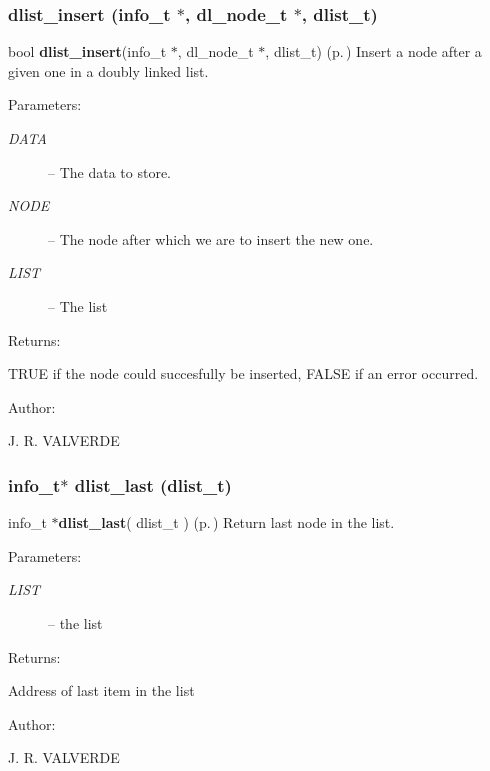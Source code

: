 \subsubsection{ dlist\_\-insert (info\_\-t $\ast$, {\bf dl\_\-node\_\-t} $\ast$, {\bf dlist\_\-t})}\label{P__dlist_8h_a5}


bool {\bf dlist\_\-insert}(info\_\-t $\ast$, dl\_\-node\_\-t $\ast$, dlist\_\-t) {\rm (p.\,\pageref{P__dlist_8h_a5})} Insert a node after a given one in a doubly linked list.

\begin{Desc}
\item[Parameters: ]\par
\begin{description}
\item[{\em 
DATA}]-- The data to store. \item[{\em 
NODE}]-- The node after which we are to insert the new one. \item[{\em 
LIST}]-- The list \end{description}
\end{Desc}
\begin{Desc}
\item[Returns: ]\par
TRUE if the node could succesfully be inserted,  FALSE if an error occurred.\end{Desc}
\begin{Desc}
\item[Author: ]\par
J. R. VALVERDE \end{Desc}
\subsubsection{\setlength{\rightskip}{0pt plus 5cm}info\_\-t$\ast$ dlist\_\-last ({\bf dlist\_\-t})}\label{P__dlist_8h_a11}


info\_\-t $\ast${\bf dlist\_\-last}( dlist\_\-t ) {\rm (p.\,\pageref{P__dlist_8h_a11})} Return last node in the list.

\begin{Desc}
\item[Parameters: ]\par
\begin{description}
\item[{\em 
LIST}]-- the list \end{description}
\end{Desc}
\begin{Desc}
\item[Returns: ]\par
Address of last item in the list\end{Desc}
\begin{Desc}
\item[Author: ]\par
J. R. VALVERDE \end{Desc}

